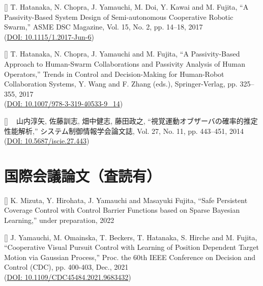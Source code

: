 \documentclass[letterpaper]{article}
\newcounter{trans}
\newcounter{conf}
\begin{document}
[]  
  T. Hatanaka, N. Chopra, J. Yamauchi, M. Doi, Y. Kawai and M. Fujita,
  ``A Passivity-Based System Design of Semi-autonomous Cooperative Robotic Swarm,''
  ASME DSC Magazine, Vol. 15, No. 2, pp. 14--18, 2017 \\ 
  (\href{http://memagazineselect.asmedigitalcollection.asme.org/article.aspx?articleid=2676649}{DOI: 10.1115/1.2017-Jun-6}) \\
\addtocounter{trans}{-1}

[] 
  T. Hatanaka, N. Chopra, J. Yamauchi and M. Fujita,
  ``A Passivity-Based Approach to Human-Swarm Collaborations and Passivity Analysis of Human Operators,''
  Trends in Control and Decision-Making for Human-Robot Collaboration Systems, Y. Wang and F. Zhang (eds.), Springer-Verlag, pp. 325--355, 2017 \\
  (\href{http://memagazineselect.asmedigitalcollection.asme.org/article.aspx?articleid=2676649}{DOI: 10.1007/978-3-319-40533-9\_14}) \\
\addtocounter{trans}{-1}

[] ~ 
  山内淳矢, 佐藤訓志, 畑中健志, 藤田政之,
  ``視覚運動オブザーバの確率的推定性能解析,'' 
  システム制御情報学会論文誌, Vol. 27, No. 11, pp. 443--451, 2014 \\ 
  (\href{http://doi.org/10.5687/iscie.27.443}{DOI: 10.5687/iscie.27.443}) \\
\addtocounter{trans}{-1}



\section*{国際会議論文（査読有）}

[]  
  K. Mizuta, Y. Hirohata, J. Yamauchi and Masayuki Fujita,
  ``Safe Persistent Coverage Control with Control Barrier Functions based on Sparse Bayesian Learning,''
  under preparation, 2022 \\
\addtocounter{conf}{-1}

[]  
  J. Yamauchi, M. Omainska, T. Beckers, T. Hatanaka, S. Hirche and M. Fujita,
  ``Cooperative Visual Pursuit Control with Learning of Position Dependent Target Motion via Gaussian Process,''
  Proc. the 60th IEEE Conference on Decision and Control (CDC), pp. 400-403, Dec., 2021 \\
  (\href{https://ieeexplore.ieee.org/document/9683432}{DOI: 10.1109/CDC45484.2021.9683432}) \\
\addtocounter{conf}{-1}
\end{document}
